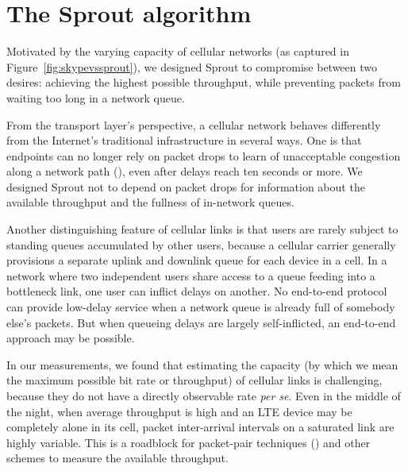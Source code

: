 \section{The Sprout algorithm}
\label{s:sprout}

Motivated by the varying capacity of cellular networks (as captured in
Figure~\ref{fig:skypevssprout}), we designed Sprout to compromise
between two desires: achieving the highest possible throughput, while
preventing packets from waiting too long in a network queue.

From the transport layer's perspective, a cellular network behaves
differently from the Internet's traditional infrastructure in several
ways. One is that endpoints can no longer rely on packet drops to
learn of unacceptable congestion along a network path
(\cite{bufferbloat}), even after delays reach ten seconds or more. We
designed Sprout not to depend on packet drops for information about
the available throughput and the fullness of in-network queues.

Another distinguishing feature of cellular links is that users are
rarely subject to standing queues accumulated by other users, because
a cellular carrier generally provisions a separate uplink and downlink
queue for each device in a cell. In a network where two independent
users share access to a queue feeding into a bottleneck link, one user
can inflict delays on another. No end-to-end protocol can provide
low-delay service when a network queue is already full of somebody
else's packets. But when queueing delays are largely self-inflicted,
an end-to-end approach may be possible.

In our measurements, we found that estimating the capacity (by which
we mean the maximum possible bit rate or throughput) of cellular links
is challenging, because they do not have a directly observable rate
{\em per se}. Even in the middle of the night, when average throughput
is high and an LTE device may be completely alone in its cell, packet
inter-arrival intervals on a saturated link are highly variable. This
is a roadblock for packet-pair techniques (\cite{packetpair}) and
other schemes to measure the available throughput.

